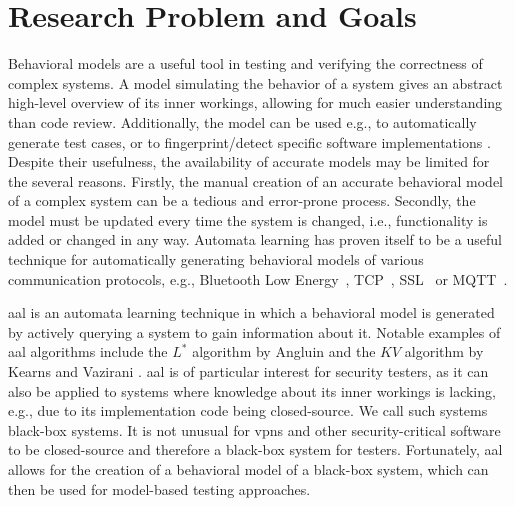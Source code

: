 \section{Research Problem and Goals}
Behavioral models are a useful tool in testing and verifying the correctness of complex systems. A model simulating the behavior of a system gives an abstract high-level overview of its inner workings, allowing for much easier understanding than code review. Additionally, the model can be used e.g., to automatically generate test cases, or to fingerprint/detect specific software implementations \cite{pferscher2021fingerprinting, pferscher2022fuzzing}. Despite their usefulness, the availability of accurate models may be limited for the several reasons. Firstly, the manual creation of an accurate behavioral model of a complex system can be a tedious and error-prone process. Secondly, the model must be updated every time the system is changed, i.e., functionality is added or changed in any way. Automata learning has proven itself to be a useful technique for automatically generating behavioral models of various communication protocols, e.g., Bluetooth Low Energy~\cite{pferscher2021fingerprinting}, TCP~\cite{DBLP:conf/cav/Fiterau-Brostean16}, SSL~\cite{DBLP:conf/spin/Fiterau-Brostean17} or MQTT~\cite{tappler2017}. 

\Ac{aal} is an automata learning technique in which a behavioral model is generated by actively querying a system to gain information about it. Notable examples of \ac{aal} algorithms include the $L^*$ algorithm by Angluin \cite{angluin1987learning} and the $KV$ algorithm by Kearns and Vazirani \cite{KV1994}. \ac{aal} is of particular interest for security testers, as it can also be applied to systems where knowledge about its inner workings is lacking, e.g., due to its implementation code being closed-source. We call such systems black-box systems. It is not unusual for \acp{vpn} and other security-critical software to be closed-source and therefore a black-box system for testers. Fortunately, \ac{aal} allows for the creation of a behavioral model of a black-box system, which can then be used for model-based testing approaches. 

